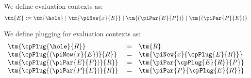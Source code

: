 \begin{definition}\label{def:hccp-evaluation-contexts}
  We define evaluation contexts as:
  \begin{gather*}
    \tm{E} := \tm{\hole} \mid \tm{\piNew{x}{E}} \mid \tm{(\piPar{E}{P})} \mid \tm{(\piPar{P}{E})}
  \end{gather*}
\end{definition}
\begin{definition}[Plugging]\label{def:hccp-evaluation-context-plugging}
  We define plugging for evaluation contexts as:
  \begin{gather*}
    \begin{array}{lcl}
      \tm{\cpPlug{\hole}{R}}          & := & \tm{R} \\
      \tm{\cpPlug{(\piNew{x}{E})}{R}} & := & \tm{\piNew{x}{\cpPlug{E}{R}}} \\
      \tm{\cpPlug{(\piPar{E}{P})}{R}} & := & \tm{\piPar{\cpPlug{E}{R}}{P}} \\
      \tm{\cpPlug{(\piPar{P}{E})}{R}} & := & \tm{\piPar{P}{\cpPlug{E}{R}}}
    \end{array}
  \end{gather*}
\end{definition}
